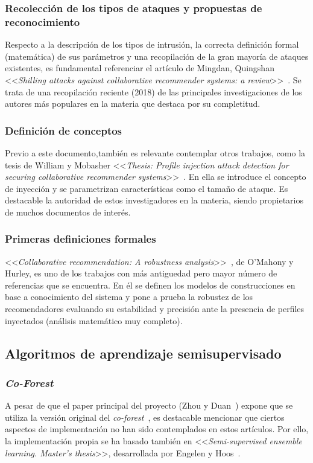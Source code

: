 \subsubsection{Recolección de los tipos de ataques y propuestas de reconocimiento~\cite{mingdan2018ShillingAttacksAReview}}
Respecto a la descripción de los tipos de intrusión, la correcta definición formal (matemática) de sus parámetros y una recopilación de la gran mayoría de ataques existentes, es fundamental referenciar el artículo de Mingdan, Quingshan <<\textit{Shilling attacks against collaborative recommender systems: a review}>>~\cite{mingdan2018ShillingAttacksAReview}. Se trata de una recopilación reciente (2018) de las principales investigaciones de los autores más populares en la materia que destaca por su completitud.

\subsubsection{Definición de conceptos~\cite{Mobasher2006Thesis}}
Previo a este documento,también es relevante contemplar otros trabajos, como la tesis de William y Mobasher <<\textit{Thesis: Profile injection attack detection for securing collaborative recommender systems}>>~\cite{Mobasher2006Thesis}. En ella se introduce el concepto de inyección y se parametrizan características como el tamaño de ataque. Es destacable la autoridad de estos investigadores en la materia, siendo propietarios de muchos documentos de interés.

	\subsubsection{Primeras definiciones formales~\citep{mahony2004CollaborativeRecommendation}}
<<\textit{Collaborative recommendation: A robustness analysis}>>~\cite{mahony2004CollaborativeRecommendation}, de O'Mahony y Hurley, es uno de los trabajos con más antiguedad pero mayor número de referencias que se encuentra. En él se definen los modelos de construcciones en base a conocimiento del sistema y pone a prueba la robustez de los recomendadores evaluando su estabilidad y precisión ante la presencia de perfiles inyectados (análisis matemático muy completo).

\subsection{Algoritmos de aprendizaje semisupervisado}

\subsubsection{\textit{Co-Forest}}

A pesar de que el paper principal del proyecto (Zhou y Duan~\cite{zhou2021SemisupervisedRecommendationAttack}) expone que se utiliza la versión original del \textit{co-forest}~\cite{originalCoForest2007}, es destacable mencionar que ciertos aspectos de implementación no han sido contemplados en estos artículos. Por ello, la implementación propia se ha basado también en <<\textit{Semi-supervised ensemble learning. Master’s thesis}>>, desarrollada por Engelen y Hoos~\cite{engelen2018thesis}.